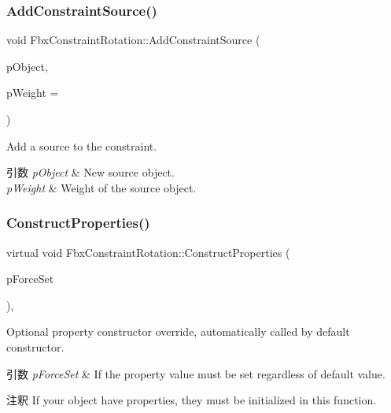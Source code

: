\subsubsection{\texorpdfstring{Add\+Constraint\+Source()}{AddConstraintSource()}}
{\footnotesize\ttfamily void Fbx\+Constraint\+Rotation\+::\+Add\+Constraint\+Source (\begin{DoxyParamCaption}\item[{\hyperlink{class_fbx_object}{Fbx\+Object} $\ast$}]{p\+Object,  }\item[{double}]{p\+Weight = {} }\end{DoxyParamCaption})}

Add a source to the constraint. 
\begin{DoxyParams}{引数}
{\em p\+Object} & New source object. \\
\hline
{\em p\+Weight} & Weight of the source object. \\
\hline
\end{DoxyParams}
\mbox{\label{class_fbx_constraint_rotation_ad9f6469905777a18e3a383f402bdd9b0}} 
\subsubsection{\texorpdfstring{Construct\+Properties()}{ConstructProperties()}}
{\footnotesize\ttfamily virtual void Fbx\+Constraint\+Rotation\+::\+Construct\+Properties (\begin{DoxyParamCaption}\item[{bool}]{p\+Force\+Set }\end{DoxyParamCaption})\hspace{0.3cm}{\ttfamily [protected]}, {\ttfamily [virtual]}}

Optional property constructor override, automatically called by default constructor. 
\begin{DoxyParams}{引数}
{\em p\+Force\+Set} & If the property value must be set regardless of default value. \\
\hline
\end{DoxyParams}
\begin{DoxyRemark}{注釈}
If your object have properties, they must be initialized in this function. 
\end{DoxyRemark}


